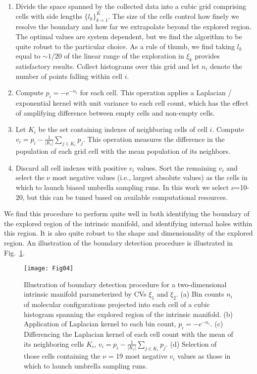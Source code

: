 \documentclass[12pt]{article}
\newcommand*{\blauw}[1]{#1}
\newcommand*{\blauwr}[1]{#1}
\begin{document}
\begin{enumerate}

\item Divide the space spanned by the collected data into a cubic grid comprising cells with side lengths $\{l_k\}_{k=1}^K$. The size of the cells control how finely we resolve the boundary and how far we extrapolate beyond the explored region. The optimal values are system dependent, but we find the algorithm to be quite robust to the particular choice. As a rule of thumb, we find taking $l_k$ equal to $\sim$$1/20$ of the linear range of the exploration in $\xi_k$ provides satisfactory results. Collect histograms over this grid and let $n_i$ denote the number of points falling within cell $i$.

\item Compute $p_i=-e^{-n_i}$ for each cell. This operation applies a Laplacian / exponential kernel with unit variance to each cell count, which has the effect of amplifying difference between empty cells and non-empty cells. 

\item Let $K_i$ be the set containing indexes of neighboring cells of cell $i$. Compute $v_i = p_i-\frac{1}{\lvert K_i \rvert}\sum_{j \in K_i} p_j$. This operation measures the difference in the population of each grid cell with the mean population of its neighbors.

\item Discard all cell indexes with positive $v_i$ values. Sort the remaining $v_i$ and select the $\nu$ \blauwr{most negative} values (i.e., largest absolute values) as the cells in which to launch biased umbrella sampling runs. In this work we select $\nu$=10-20, but this can be tuned based on available computational resources.

\end{enumerate}

We find this procedure to perform quite well in both identifying the boundary of the explored region of the intrinsic manifold, and identifying internal holes within this region. It is also quite robust to the shape and dimensionality of the explored region. An illustration of the boundary detection procedure is illustrated in \blauw{Fig.~\ref{diagram_of_finding_boundary}}.
 
\begin{figure}[ht!]
\begin{center}
\texttt{[image: Fig04]} 
\caption{Illustration of boundary detection procedure for a two-dimensional intrinsic manifold parameterized by CVs $\xi_1$ and $\xi_2$. (a) Bin counts $n_i$ of molecular configurations projected into each cell of a cubic histogram spanning the explored region of the intrinsic manifold. (b) Application of Laplacian kernel to each bin count, $p_i = -e^{-n_i}$. (c) Differencing the Laplacian kernel of each cell count with the mean of its neighboring cells $K_i$, $v_i = p_i-\frac{1}{\lvert K_i \rvert}\sum_{j \in K_i} p_j$. (d) Selection of those cells containing the $\nu$ = 19 \blauwr{most negative} $v_i$ values as those in which to launch umbrella sampling runs.} \label{diagram_of_finding_boundary}
\end{center}
\end{figure}
\end{document}

